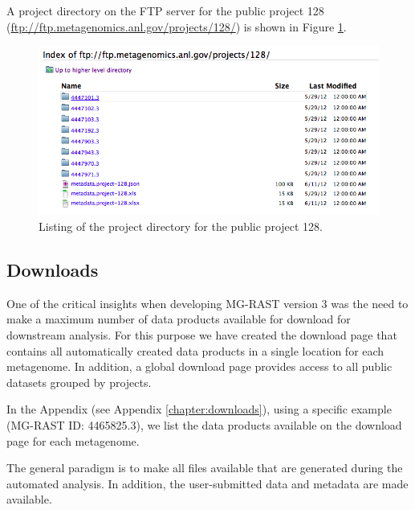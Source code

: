 \documentclass[12pt,fullpage]{report}
\begin{document}

A project directory on the FTP server for the public project 128 (\url{ftp://ftp.metagenomics.anl.gov/projects/128/})
is shown in Figure \ref{fig:ftp-server-project-view}.

\begin{figure}[ht]
\begin{center}
\includegraphics[width=6in]{Images/ftp-server-project-view.png}
\end{center}
\caption{Listing of the project directory for the public project 128.
}
\label{fig:ftp-server-project-view}
\end{figure}
\subsection{Downloads}
One of the critical insights when developing MG-RAST version 3 was the need to make a maximum number of data products available for download for downstream analysis. For this purpose we have created the download page that contains all automatically created data products in a single location for each metagenome. In addition, a global download page provides access to all public datasets grouped by projects.

In the Appendix (see Appendix \ref{chapter:downloads}),
using a specific example (MG-RAST ID: 4465825.3),
we list the data products available on the download page for each metagenome.

The general paradigm is to make all files available that are generated during the automated analysis. In addition, the user-submitted data and metadata are made available.
\end{document}
